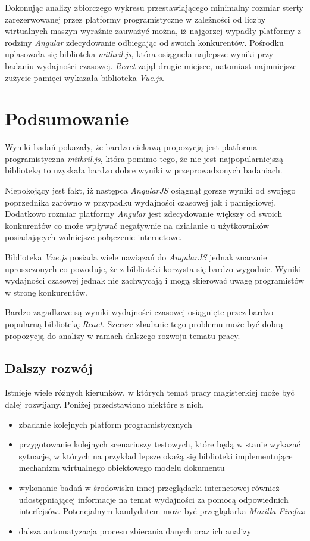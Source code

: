 \documentclass[polish, twoside, 12pt]{mwart}
\let\stdsection\section
\renewcommand*{\section}{\clearpage\stdsection}
\begin{document}
Dokonując analizy zbiorczego wykresu przestawiającego minimalny rozmiar sterty zarezerwowanej przez platformy programistyczne w zależności od liczby wirtualnych maszyn wyraźnie zauważyć można, iż najgorzej wypadły platformy z rodziny \emph{Angular} zdecydowanie odbiegając od swoich konkurentów. Pośrodku uplasowała się biblioteka \emph{mithril.js}, która osiągneła najlepsze wyniki przy badaniu wydajności czasowej. \emph{React} zajął drugie miejsce, natomiast najmniejsze zużycie pamięci wykazała biblioteka \emph{Vue.js}.

\section{Podsumowanie}

Wyniki badań pokazały, że bardzo ciekawą propozycją jest platforma programistyczna \emph{mithril.js}, która pomimo tego, że nie jest najpopularniejszą biblioteką to uzyskała bardzo dobre wyniki w przeprowadzonych badaniach. 

Niepokojący jest fakt, iż następca \emph{AngularJS} osiągnął gorsze wyniki od swojego poprzednika zarówno w przypadku wydajności czasowej jak i pamięciowej. Dodatkowo rozmiar platformy \emph{Angular} jest zdecydowanie większy od swoich konkurentów co może wpływać negatywnie na działanie u użytkowników posiadających wolniejsze połączenie internetowe.

Biblioteka \emph{Vue.js} posiada wiele nawiązań do \emph{AngularJS} jednak znacznie uproszczonych co powoduje, że z biblioteki korzysta się bardzo wygodnie. Wyniki wydajności czasowej jednak nie zachwycają i mogą skierować uwagę programistów w stronę konkurentów.

Bardzo zagadkowe są wyniki wydajności czasowej osiągnięte przez bardzo popularną bibliotekę \emph{React}. Szersze zbadanie tego problemu może być dobrą propozycją do analizy w ramach dalszego rozwoju tematu pracy.

\subsection{Dalszy rozwój}

Istnieje wiele różnych kierunków, w których temat pracy magisterkiej może być dalej rozwijany. Poniżej przedstawiono niektóre z nich.

\begin{itemize}
  \item zbadanie kolejnych platform programistycznych
  \item przygotowanie kolejnych scenariuszy testowych, które będą w stanie wykazać sytuacje, w których na przykład lepsze okażą się biblioteki implementujące mechanizm wirtualnego obiektowego modelu dokumentu
  \item wykonanie badań w środowisku innej przeglądarki internetowej również udostępniającej informacje na temat wydajności za pomocą odpowiednich interfejsów. Potencjalnym kandydatem może być przeglądarka \emph{Mozilla Firefox} \cite{firefox}
  \item dalsza automatyzacja procesu zbierania danych oraz ich analizy
\end{itemize}
\end{document}
